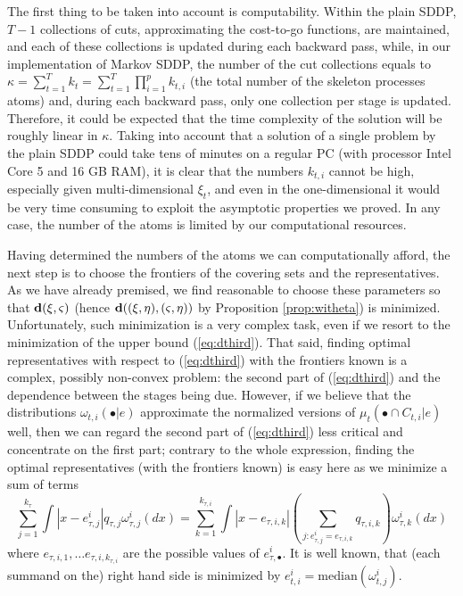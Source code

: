 \documentclass{article}              %
\begin{document}
The first thing to be taken into account is computability. Within the plain SDDP, $T-1$ collections of cuts, approximating
the cost-to-go functions, are maintained, and each of these collections
is updated during each backward pass, while, in our implementation of Markov SDDP, the number
of the cut collections equals to $\kappa=\sum_{t=1}^{T}k_{t}=\sum_{t=1}^{T}\prod_{i=1}^{p}k_{t,i}$
(the total number of the skeleton processes atoms) and, during each
backward pass, only one collection per stage is updated. Therefore,
it could be expected that the time complexity of the solution will
be roughly linear in $\kappa$. Taking into account that a solution of a single problem by the plain
SDDP could take tens of minutes on a regular PC (with processor Intel Core 5 and 16 GB RAM), it is clear that the numbers $k_{t,i}$ cannot be
high, especially given multi-dimensional $\xi_{t}$, and even
in the one-dimensional it would be very time consuming to exploit the
asymptotic properties we proved. In any case, the number of the atoms
is limited by our computational resources.

Having determined the numbers of the atoms we can computationally afford, the next step is to choose the
frontiers of the covering sets and the representatives. As we have
already premised, we find reasonable to choose these parameters so
that $\mathbf{d}(\xi,\varsigma)$ (hence $\mathbf{d}((\xi,\eta),(\varsigma,\eta))$
by Proposition \ref{prop:witheta}) is minimized. 
Unfortunately, such minimization is a very complex task, even if we resort to the minimization of the upper bound (\ref{eq:dthird}).
That said, finding optimal representatives with respect to (\ref{eq:dthird})
with the frontiers known is a complex, possibly non-convex problem:
the second part of (\ref{eq:dthird}) and the dependence between
the stages being due. However, if we believe that the distributions
$\omega_{t,i}(\bullet|e)$ approximate the normalized versions of
$\mu_{t}(\bullet\cap C_{t,i}|e)$ well, then we can regard the second part of (\ref{eq:dthird}) less critical and concentrate on the
first part; contrary to the whole expression, finding the optimal
representatives (with the frontiers known) is easy here as we minimize a sum of terms 
$$
\sum_{j=1}^{k_{\tau}}\int|x-e_{\tau,j}^{i}|q_{\tau,j}\omega^i_{\tau,j}(dx)
=
\sum_{k=1}^{k_{\tau,i}} \int|x-e_{\tau,i,k}| \left(\sum_{j:e^i_{\tau,j}=e_{\tau,i,k}} q_{\tau,i,k} \right)
\omega^i_{\tau,k} (dx)
$$
where $e_{\tau,i,1},\dots e_{\tau,i,k_{\tau,i}}$ are the possible values of $e^i_{\tau,\bullet}$. It is well known, that (each summand on the) right hand side is minimized by $e_{t,i}^{i}=\mathrm{median}(\omega^i_{t,j})$.
\end{document}
